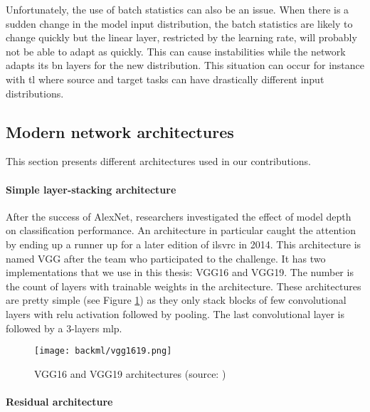 Unfortunately, the use of batch statistics can also be an issue. When there is a
sudden change in the model input distribution, the batch statistics are likely to
change quickly but the linear layer, restricted by the learning rate, will probably
not be able to adapt as quickly. This can cause instabilities while the network
adapts its \acrlong{bn} layers for the new distribution. This situation can occur
for instance with \acrlong{tl} where source and target tasks can have drastically
different input distributions.

\subsection{Modern network architectures}
\label{ssec:backml:dl:modernarchi}

This section presents different architectures used in our contributions.

\paragraph{Simple layer-stacking architecture}
\label{sssec:backml:arch:layerstacking}
After the success of AlexNet, researchers investigated the effect of model depth
on classification performance. An architecture in particular caught the attention
by ending up a runner up for a later edition of \acrshort{ilsvrc} in 2014. This
architecture is named VGG \cite{simonyan2014very} after the team who participated
to the challenge. It has two implementations that we use in this thesis: VGG16 and VGG19.
The number is the count of layers with trainable weights in the architecture.
These architectures are pretty simple (see Figure \ref{fig:backml:vgg})
as they only stack blocks of few convolutional layers with \acrshort{relu} activation
followed by pooling. The last convolutional layer is followed by a 3-layers
\acrshort{mlp}.

\begin{figure}
  \centering
  \texttt{[image: backml/vgg1619.png]}
  \caption{VGG16 and VGG19 architectures (source: \cite{img:vgg1619})}
  \label{fig:backml:vgg}
\end{figure}

\paragraph{Residual architecture}
\label{sssec:backml:arch:residual}

